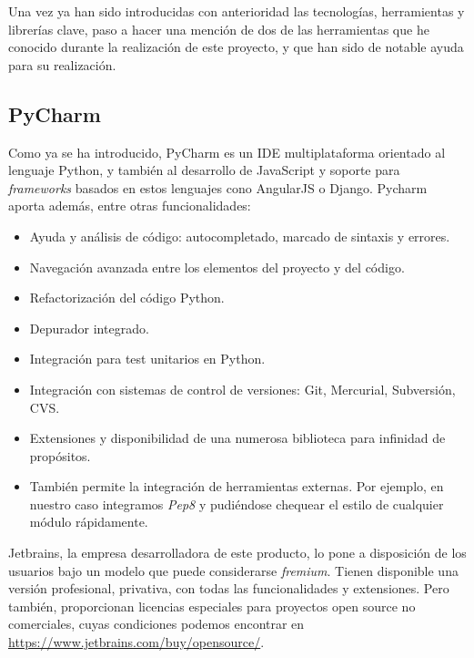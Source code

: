 Una vez ya han sido introducidas con anterioridad las tecnologías, herramientas y librerías clave, paso a hacer una mención de dos de las herramientas que he conocido durante la realización de este proyecto, y que han sido de notable ayuda para su realización.

\subsection{PyCharm}
\label{subsec:pycharm}

Como ya se ha introducido, PyCharm es un IDE multiplataforma orientado al lenguaje Python, y también al desarrollo de JavaScript y soporte para \textit{frameworks} basados en estos lenguajes cono AngularJS o Django. Pycharm aporta además, entre otras funcionalidades:

\begin{itemize}
\item Ayuda y análisis de código: autocompletado, marcado de sintaxis y errores.

\item Navegación avanzada entre los elementos del proyecto y del código.

\item Refactorización del código Python.

\item Depurador integrado.

\item Integración para test unitarios en Python.

\item Integración con sistemas de control de versiones: Git, Mercurial, Subversión, CVS.

\item Extensiones y disponibilidad de una numerosa biblioteca para infinidad de propósitos.

\item También permite la integración de herramientas externas. Por ejemplo, en nuestro caso integramos \textit{Pep8} y pudiéndose chequear el estilo de cualquier módulo rápidamente.
\end{itemize}

Jetbrains, la empresa desarrolladora de este producto, lo pone a disposición de los usuarios bajo un modelo que puede considerarse \textit{fremium}. Tienen disponible una versión profesional, privativa, con todas las funcionalidades y extensiones. Pero también, proporcionan licencias especiales para proyectos open source no comerciales, cuyas condiciones podemos encontrar en \space \url{https://www.jetbrains.com/buy/opensource/}.


